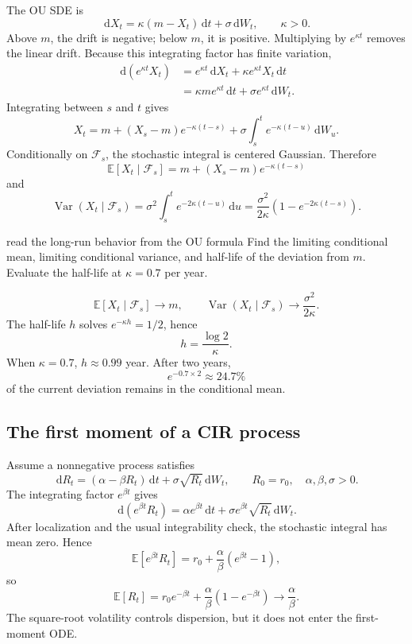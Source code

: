 \documentclass[10pt]{article}
\newcommand{\E}{\mathbb E}
\newcommand{\1}{\mathbf 1}
\newcommand{\cF}{\mathcal F}
\newcommand{\dd}{\,\mathrm d}
\DeclareMathOperator{\Var}{Var}
\theoremstyle{definition}
\begin{document}
The OU SDE is
\[
\dd X_t=\kappa(m-X_t)\dd t+\sigma\dd W_t,
\qquad \kappa>0.
\]
Above \(m\), the drift is negative; below \(m\), it is positive. Multiplying
by \(e^{\kappa t}\) removes the linear drift. Because this integrating factor
has finite variation,
\[
\begin{aligned}
\dd(e^{\kappa t}X_t)
&=e^{\kappa t}\dd X_t+\kappa e^{\kappa t}X_t\dd t\\
&=\kappa m e^{\kappa t}\dd t+\sigma e^{\kappa t}\dd W_t.
\end{aligned}
\]
Integrating between \(s\) and \(t\) gives
\[
\boxed{
X_t=m+(X_s-m)e^{-\kappa(t-s)}
+\sigma\int_s^t e^{-\kappa(t-u)}\dd W_u.}
\]
Conditionally on \(\cF_s\), the stochastic integral is centered Gaussian.
Therefore
\[
\E[X_t\mid\cF_s]
=m+(X_s-m)e^{-\kappa(t-s)}
\]
and
\[
\Var(X_t\mid\cF_s)
=\sigma^2\int_s^te^{-2\kappa(t-u)}\dd u
=\frac{\sigma^2}{2\kappa}
\left(1-e^{-2\kappa(t-s)}\right).
\]

\begin{studentexercise}{read the long-run behavior from the OU formula}
Find the limiting conditional mean, limiting conditional variance, and
half-life of the deviation from \(m\). Evaluate the half-life at
\(\kappa=0.7\) per year.
\end{studentexercise}
\begin{shortsolution}
\[
\E[X_t\mid\cF_s]\longrightarrow m,
\qquad
\Var(X_t\mid\cF_s)\longrightarrow\frac{\sigma^2}{2\kappa}.
\]
The half-life \(h\) solves \(e^{-\kappa h}=1/2\), hence
\[
\boxed{h=\frac{\log2}{\kappa}.}
\]
When \(\kappa=0.7\), \(h\approx0.99\) year. After two years,
\[
e^{-0.7\times2}\approx24.7\%
\]
of the current deviation remains in the conditional mean.
\end{shortsolution}

\subsection{The first moment of a CIR process}

Assume a nonnegative process satisfies
\[
\dd R_t=(\alpha-\beta R_t)\dd t
+\sigma\sqrt{R_t}\dd W_t,
\qquad
R_0=r_0,\quad \alpha,\beta,\sigma>0.
\]
The integrating factor \(e^{\beta t}\) gives
\[
\dd(e^{\beta t}R_t)
=\alpha e^{\beta t}\dd t
+\sigma e^{\beta t}\sqrt{R_t}\dd W_t.
\]
After localization and the usual integrability check, the stochastic
integral has mean zero. Hence
\[
\E[e^{\beta t}R_t]
=r_0+\frac{\alpha}{\beta}(e^{\beta t}-1),
\]
so
\[
\boxed{
\E[R_t]
=r_0e^{-\beta t}
+\frac{\alpha}{\beta}(1-e^{-\beta t})
\longrightarrow\frac{\alpha}{\beta}.}
\]
The square-root volatility controls dispersion, but it does not enter the
first-moment ODE.
\end{document}
